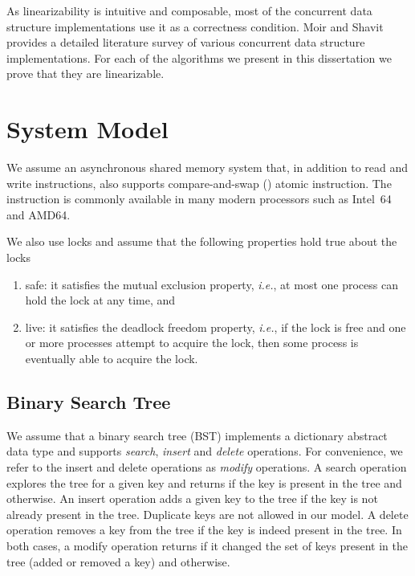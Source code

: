 As linearizability is intuitive and composable, most of the concurrent data structure implementations use it as a correctness condition. Moir and Shavit~\cite{moirSha:2007} provides a detailed literature survey of various concurrent data structure implementations. For each of the algorithms we present in this dissertation we prove that they are linearizable.


\section{System Model}
We assume an asynchronous shared memory system that, in addition to read and write instructions, also supports compare-and-swap (\CAS{}) atomic instruction. The \CAS{} instruction is commonly available in many modern processors such as Intel~64 and AMD64. 

We also use locks and assume that the following properties hold true about the locks
\begin{enumerate}[label=(\alph*)]
\item safe: it satisfies the mutual exclusion property, \emph{i.e.}, at most one process can hold the lock at any time, and 
\item live: it satisfies the deadlock freedom property, \emph{i.e.}, if the lock is free and one or more processes attempt to acquire the lock, then some process is eventually able to acquire the lock.
\end{enumerate}

\subsection{Binary Search Tree}
We assume that a binary search tree (BST) implements a dictionary abstract data type and supports \emph{search}, \emph{insert} and \emph{delete} operations. For convenience, we refer to the insert and delete operations as \emph{modify} operations. A search operation explores the tree for a given key and returns \true{} if the key is present in the tree and \false{} otherwise. An insert operation adds a given key to the tree if the key is not already present in the tree. Duplicate keys are not allowed in our model. A delete operation removes a key from the tree if the key is indeed present in the tree. In both cases, a modify operation returns \true{} if it changed the set of keys present in the tree (added or removed a key) and \false{} otherwise.

